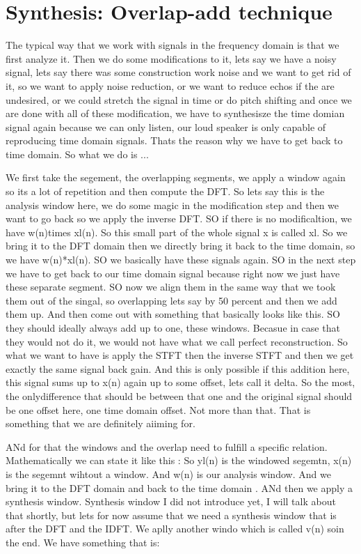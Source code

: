 \clearpage
\section{Synthesis: Overlap-add technique}
\label{Synthesis: Overlap-add technique}

The typical way that we work with signals in the frequency domain is that we first analyze it. Then we do some modifications to it, lets say we have a noisy signal, lets say there was some construction work noise and we want to get rid of it, so we want to apply noise reduction, or we want to reduce echos if the are undesired, or we could stretch the signal in time or do pitch shifting and once we are done with all of these modification, we have to synthesisze the time domian signal again because we can only listen, our loud speaker is only capable of reproducing time domain signals. Thats the reason why we have to get back to time domain. So what we do is ...

We first take the segement, the overlapping segments, we apply a window again so its a lot of repetition and then compute the DFT. So lets say this is the analysis window here, we do some magic in the modification step and then we want to go back so we apply the inverse DFT. SO if there is no modificaltion, we have w(n)times xl(n). So this small part of the whole signal x is called xl.  So we bring it to the DFT domain then we directly bring it back to the time domain, so we have w(n)*xl(n). SO we basically have these signals again. SO in the next step we have to get back to our time domain signal because right now we just have these separate segment. SO now we align them in the same way that we took them out of the singal, so overlapping lets say by 50 percent and then we add them up.  And then come out with something that basically looks like this.  SO they should ideally always add up to one, these windows.  Becasue in case that they would not do it, we would not have what we call perfect reconstruction. So what we want to have is apply the STFT then the inverse STFT and then we get exactly the same signal back gain. And this is only possible if this addition here, this signal sums up to x(n) again up to some offset, lets call it delta. So the most, the onlydifference that should be between that one and the original signal should be one offset here, one time domain offset. Not more than that.  That is something that we are definitely aiiming for. 

ANd for that the windows and the overlap need to fulfill a specific relation. Mathematically we can state it like this :
So yl(n) is the windowed segemtn, x(n) is the segemnt wihtout a window. And w(n) is our analysis window. And we bring it to the DFT domain and back to the time domain .  ANd then we apply a synthesis window.  Synthesis window I did not introduce yet, I will talk about that shortly, but lets for now assume that we need a synthesis window that is after the DFT and the IDFT. We aplly another windo which is called v(n) soin the end. We have something that is:

